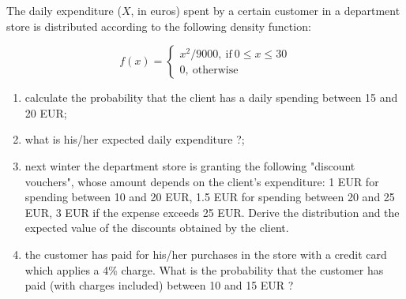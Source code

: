 \begin{question}
The daily expenditure ($X$, in euros) spent by a certain customer in a department store is distributed according to the following density function:

\begin{equation*}
f(x) = 
\begin{cases}
x^2/9000,~\textrm{if}~0 \leq x \leq 30\\
0,~\textrm{otherwise}		
\end{cases}
\end{equation*}

\begin{enumerate}[label={\emph{\alph*})}]
\item calculate the probability that the client has a daily spending between 15 and 20 EUR;
\item what is his/her expected daily expenditure ?;
\item next winter the department store is granting the following "discount vouchers", whose amount depends on the client's expenditure: 1 EUR for spending between 10 and 20 EUR, 1.5 EUR for spending between 20 and 25 EUR,
3 EUR if the expense exceeds 25 EUR. Derive the distribution and the expected value of the discounts obtained by the client.
\item the customer has paid for his/her purchases in the store with a credit card which applies a 4\% charge. What is the probability that the customer has paid (with charges included) between 10 and 15 EUR ?
\end{enumerate}
\end{question}

